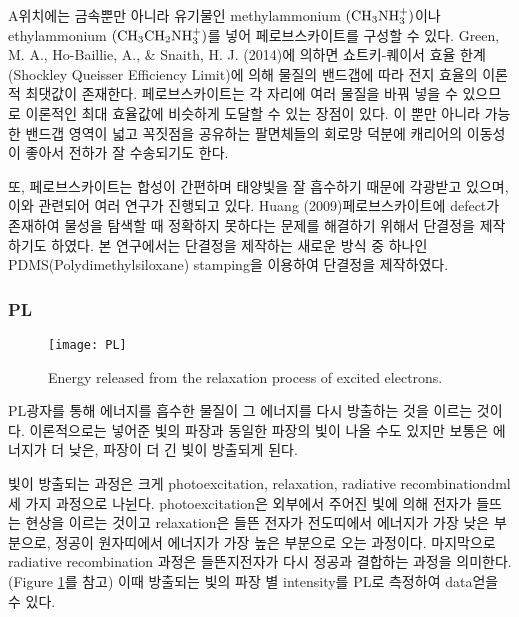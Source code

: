 A위치에는 금속뿐만 아니라 유기물인  methylammonium $\rm(CH_3NH_3^+)$이나 ethylammonium $\rm(CH_3CH_2NH_3^+)$를 넣어 페로브스카이트를 구성할 수 있다. Green, M. A., Ho-Baillie, A., \& Snaith, H. J. (2014)에 의하면 쇼트키-퀘이서 효율 한계(Shockley Queisser Efficiency Limit)에 의해 물질의 밴드갭에 따라 전지 효율의 이론적 최댓값이 존재한다\cite{green2014emergence}. 페로브스카이트는 각 자리에 여러 물질을 바꿔 넣을 수 있으므로 이론적인 최대 효율값에 비슷하게 도달할 수  있는 장점이 있다. 이 뿐만 아니라 가능한 밴드갭 영역이 넓고 꼭짓점을 공유하는 팔면체들의 회로망 덕분에 캐리어의 이동성이 좋아서 전하가 잘 수송되기도 한다\cite{green2014emergence}.

또, 페로브스카이트는 합성이 간편하며 태양빛을 잘 흡수하기 때문에 각광받고 있으며, 이와 관련되어 여러 연구가 진행되고 있다. Huang (2009)\은 페로브스카이트에 defect가 존재하여 물성을 탐색할 때 정확하지 못하다는 문제를 해결하기 위해서 단결정을 제작하기도 하였다\cite{huang2009fabrication}. 본 연구에서는 단결정을 제작하는 새로운 방식 중 하나인 PDMS(Polydimethylsiloxane) stamping을 이용하여 단결정을 제작하였다.
\\

\subsubsection{PL}

\begin{figure}[H]
	\begin{center}
			\texttt{[image: PL]}
	\end{center}
	\caption{Energy released from the relaxation process of excited electrons.}
	\label{fig:pl} 
\end{figure}

PL\는 광자를 통해 에너지를 흡수한 물질이 그 에너지를 다시 방출하는 것을 이르는 것이다. 이론적으로는 넣어준 빛의 파장과 동일한 파장의 빛이 나올 수도 있지만 보통은 에너지가 더 낮은, 파장이 더 긴 빛이 방출되게 된다. 

빛이 방출되는 과정은 크게 photoexcitation, relaxation, radiative recombinationdml 세 가지 과정으로 나뉜다. photoexcitation은 외부에서 주어진 빛에 의해 전자가 들뜨는 현상을 이르는 것이고 relaxation은 들뜬 전자가 전도띠에서 에너지가 가장 낮은 부분으로, 정공이 원자띠에서 에너지가 가장 높은 부분으로 오는 과정이다. 마지막으로 radiative recombination 과정은 들뜬지전자가 다시 정공과 결합하는 과정을 의미한다. (Figure \ref{fig:pl}를 참고) 이때 방출되는 빛의 파장 별 intensity를 PL로 측정하여 data\를 얻을 수 있다.
\\

